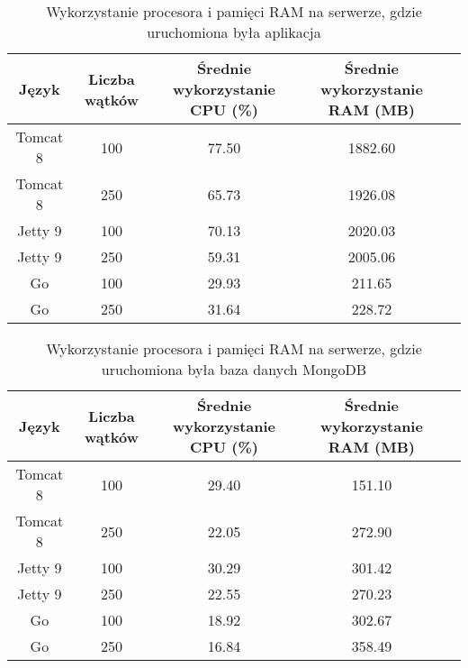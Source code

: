 
\begin{table}[!htb]
\centering
\caption{Wykorzystanie procesora i pamięci RAM na serwerze, gdzie uruchomiona była aplikacja}
\label{tab:app-clean-api}
\begin{tabular}{@{}ccccl@{}}
\toprule
\textbf{Język} & \textbf{Liczba wątków} & \multicolumn{1}{p{3cm}}{\textbf{Średnie wykorzystanie CPU (\%)}} & \multicolumn{1}{p{3cm}}{\textbf{Średnie wykorzystanie RAM (MB)}} &  \\ \midrule
Tomcat 8       & 100                    & 77.50                             & 1882.60                          &  \\
Tomcat 8       & 250                    & 65.73                             & 1926.08                          &  \\
Jetty 9       & 100                    & 70.13                             & 2020.03                          &  \\
Jetty 9       & 250                    & 59.31                             & 2005.06                          &  \\
Go       & 100                    & 29.93                             & 211.65                          &  \\
Go       & 250                    & 31.64                             & 228.72                          &  \\
\bottomrule
\end{tabular}
\end{table}


\begin{table}[!htb]
\centering
\caption{Wykorzystanie procesora i pamięci RAM na serwerze, gdzie uruchomiona była baza danych MongoDB}
\label{tab:mongo-clean-api}
\begin{tabular}{@{}ccccl@{}}
\toprule
\textbf{Język} & \textbf{Liczba wątków} & \multicolumn{1}{p{3cm}}{\textbf{Średnie wykorzystanie CPU (\%)}} & \multicolumn{1}{p{3cm}}{\textbf{Średnie wykorzystanie RAM (MB)}} &  \\ \midrule
Tomcat 8       & 100                    & 29.40                             & 151.10                          &  \\
Tomcat 8       & 250                    & 22.05                             & 272.90                          &  \\
Jetty 9       & 100                    & 30.29                             & 301.42                          &  \\
Jetty 9       & 250                    & 22.55                             & 270.23                          &  \\
Go       & 100                    & 18.92                             & 302.67                          &  \\
Go       & 250                    & 16.84                             & 358.49                          &  \\
\bottomrule
\end{tabular}
\end{table}

